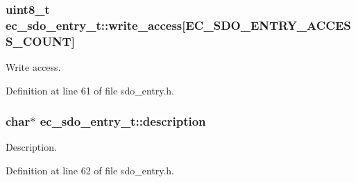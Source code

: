 \subsubsection[{write\-\_\-access}]{\setlength{\rightskip}{0pt plus 5cm}uint8\-\_\-t ec\-\_\-sdo\-\_\-entry\-\_\-t\-::write\-\_\-access[{\bf E\-C\-\_\-\-S\-D\-O\-\_\-\-E\-N\-T\-R\-Y\-\_\-\-A\-C\-C\-E\-S\-S\-\_\-\-C\-O\-U\-N\-T}]}\label{structec__sdo__entry__t_a06615e177748b777d53f333c3790614d}


Write access. 



Definition at line 61 of file sdo\-\_\-entry.\-h.

\subsubsection[{description}]{\setlength{\rightskip}{0pt plus 5cm}char$\ast$ ec\-\_\-sdo\-\_\-entry\-\_\-t\-::description}\label{structec__sdo__entry__t_ad145c04a675a87b012e0b2666b8b9453}


Description. 



Definition at line 62 of file sdo\-\_\-entry.\-h.


